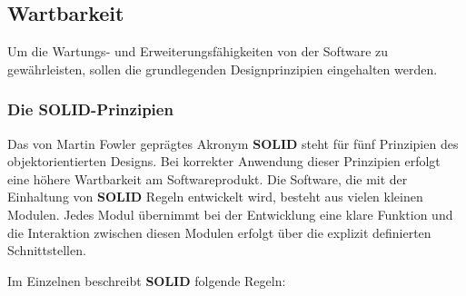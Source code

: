 \subsection{Wartbarkeit}\label{maintenance}

Um die Wartungs- und Erweiterungsfähigkeiten von der Software zu gewährleisten, sollen die grundlegenden Designprinzipien eingehalten werden.

\subsubsection{Die SOLID-Prinzipien}\label{solid}

Das von Martin Fowler geprägtes Akronym \textbf{SOLID}\cite{solid} steht für fünf Prinzipien des objektorientierten Designs. Bei korrekter Anwendung dieser Prinzipien erfolgt eine höhere Wartbarkeit am Softwareprodukt. Die Software, die mit der Einhaltung von \textbf{SOLID} Regeln entwickelt wird, besteht aus vielen kleinen Modulen. Jedes Modul übernimmt bei der Entwicklung eine klare Funktion und die Interaktion zwischen diesen Modulen erfolgt über die explizit definierten Schnittstellen.

Im Einzelnen beschreibt \textbf{SOLID} folgende Regeln:

